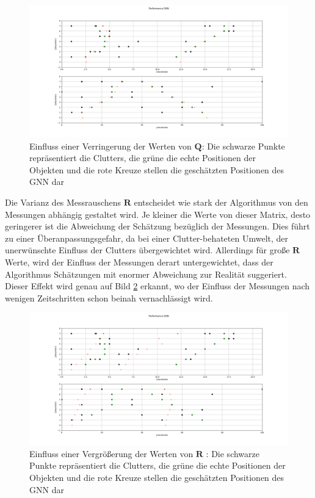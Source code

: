 \documentclass[10pt,a4paper]{article}
\begin{document}
\begin{figure}[h!]
\centering
\includegraphics[width=12 cm]{./Pictures_report/GNNQ0}
\caption{Einfluss einer Verringerung der Werten von $\textbf{Q}$: Die schwarze Punkte repräsentiert die Clutters, die grüne die echte Positionen der Objekten und die rote Kreuze stellen die geschätzten Positionen des GNN dar}
\label{pic:GNNQ0}
\end{figure}
Die Varianz des Messrauschens $\textbf{R}$ entscheidet wie stark der Algorithmus von den Messungen abhängig gestaltet wird. Je kleiner die Werte von dieser Matrix, desto geringerer ist die Abweichung der Schätzung bezüglich der Messungen. Dies führt zu einer Überanpassungsgefahr, da bei einer Clutter-behateten Umwelt, der unerwünschte Einfluss der Clutters übergewichtet wird. Allerdings für große $\textbf{R}$ Werte, wird der Einfluss der Messungen derart untergewichtet, dass der Algorithmus Schätzungen mit enormer Abweichung zur Realität suggeriert. Dieser Effekt wird genau auf Bild \ref{pic:GNNR1} erkannt, wo der Einfluss der Messungen nach wenigen Zeitschritten schon beinah vernachlässigt wird.\\
\begin{figure}[h!]
\centering
\includegraphics[width=12 cm]{./Pictures_report/GNNR1}
\caption{Einfluss einer Vergrößerung der Werten von $\textbf{R}$ : Die schwarze Punkte repräsentiert die Clutters, die grüne die echte Positionen der Objekten und die rote Kreuze stellen die geschätzten Positionen des GNN dar}
\label{pic:GNNR1}
\end{figure}
\end{document}
